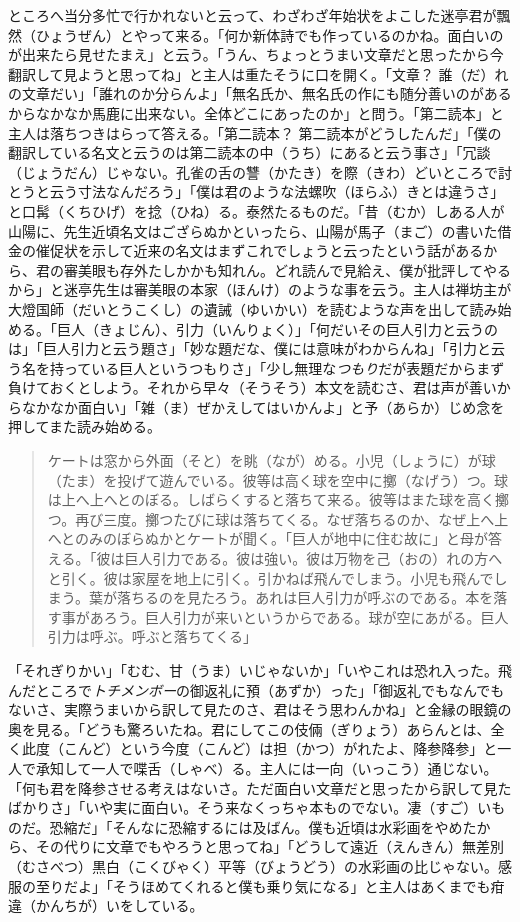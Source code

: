 \documentclass{book}
\begin{document}
ところへ当分多忙で行かれないと云って、わざわざ年始状をよこした迷亭君が飄然（ひょうぜん）とやって来る。「何か新体詩でも作っているのかね。面白いのが出来たら見せたまえ」と云う。「うん、ちょっとうまい文章だと思ったから今翻訳して見ようと思ってね」と主人は重たそうに口を開く。「文章？ 誰（だ）れの文章だい」「誰れのか分らんよ」「無名氏か、無名氏の作にも随分善いのがあるからなかなか馬鹿に出来ない。全体どこにあったのか」と問う。「第二読本」と主人は落ちつきはらって答える。「第二読本？ 第二読本がどうしたんだ」「僕の翻訳している名文と云うのは第二読本の中（うち）にあると云う事さ」「冗談（じょうだん）じゃない。孔雀の舌の讐（かたき）を際（きわ）どいところで討とうと云う寸法なんだろう」「僕は君のような法螺吹（ほらふ）きとは違うさ」と口髯（くちひげ）を捻（ひね）る。泰然たるものだ。「昔（むか）しある人が山陽に、先生近頃名文はござらぬかといったら、山陽が馬子（まご）の書いた借金の催促状を示して近来の名文はまずこれでしょうと云ったという話があるから、君の審美眼も存外たしかかも知れん。どれ読んで見給え、僕が批評してやるから」と迷亭先生は審美眼の本家（ほんけ）のような事を云う。主人は禅坊主が大燈国師（だいとうこくし）の遺誡（ゆいかい）を読むような声を出して読み始める。「巨人（きょじん）、引力（いんりょく）」「何だいその巨人引力と云うのは」「巨人引力と云う題さ」「妙な題だな、僕には意味がわからんね」「引力と云う名を持っている巨人というつもりさ」「少し無理な\emph{つもり}だが表題だからまず負けておくとしよう。それから早々（そうそう）本文を読むさ、君は声が善いからなかなか面白い」「雑（ま）ぜかえしてはいかんよ」と予（あらか）じめ念を押してまた読み始める。

\blockquote{ケートは窓から外面（そと）を眺（なが）める。小児（しょうに）が球（たま）を投げて遊んでいる。彼等は高く球を空中に擲（なげう）つ。球は上へ上へとのぼる。しばらくすると落ちて来る。彼等はまた球を高く擲つ。再び三度。擲つたびに球は落ちてくる。なぜ落ちるのか、なぜ上へ上へとのみのぼらぬかとケートが聞く。「巨人が地中に住む故に」と母が答える。「彼は巨人引力である。彼は強い。彼は万物を己（おの）れの方へと引く。彼は家屋を地上に引く。引かねば飛んでしまう。小児も飛んでしまう。葉が落ちるのを見たろう。あれは巨人引力が呼ぶのである。本を落す事があろう。巨人引力が来いというからである。球が空にあがる。巨人引力は呼ぶ。呼ぶと落ちてくる」}

「それぎりかい」「むむ、甘（うま）いじゃないか」「いやこれは恐れ入った。飛んだところで\emph{トチメンボー}の御返礼に預（あずか）った」「御返礼でもなんでもないさ、実際うまいから訳して見たのさ、君はそう思わんかね」と金縁の眼鏡の奥を見る。「どうも驚ろいたね。君にしてこの伎倆（ぎりょう）あらんとは、全く此度（こんど）という今度（こんど）は担（かつ）がれたよ、降参降参」と一人で承知して一人で喋舌（しゃべ）る。主人には一向（いっこう）通じない。「何も君を降参させる考えはないさ。ただ面白い文章だと思ったから訳して見たばかりさ」「いや実に面白い。そう来なくっちゃ本ものでない。凄（すご）いものだ。恐縮だ」「そんなに恐縮するには及ばん。僕も近頃は水彩画をやめたから、その代りに文章でもやろうと思ってね」「どうして遠近（えんきん）無差別（むさべつ）黒白（こくびゃく）平等（びょうどう）の水彩画の比じゃない。感服の至りだよ」「そうほめてくれると僕も乗り気になる」と主人はあくまでも疳違（かんちが）いをしている。
\end{document}

